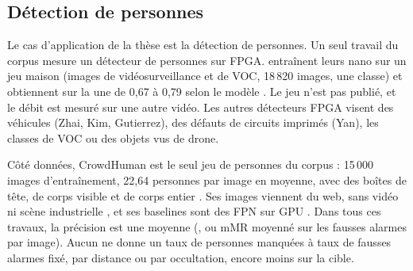 \subsection{Détection de personnes}

Le cas d'application de la thèse est la détection de personnes. Un seul travail du corpus
mesure un détecteur de personnes sur FPGA. \citet{arxiv-2607.13106-no-attention-no-problem-dpu}\pp{}
entraînent leurs  nano sur un jeu maison (images de vidéosurveillance et de VOC, 18\,820
images, une classe) et obtiennent sur la  une  de 0,67 à 0,79 selon le
modèle . Le jeu n'est pas publié, et le débit est mesuré sur une
autre vidéo. Les autres détecteurs FPGA visent des véhicules (Zhai, Kim, Gutierrez), des
défauts de circuits imprimés (Yan), les classes de VOC ou des objets vus de drone.

Côté données, CrowdHuman
\citep{arxiv-1805.00123-crowdhuman-benchmark-detecting-human-crowd}\pp{} est le seul jeu de
personnes du corpus : 15\,000 images d'entraînement, 22,64 personnes par image en moyenne,
avec des boîtes de tête, de corps visible et de corps entier . Ses images
viennent du web, sans vidéo ni scène industrielle , et ses baselines sont des
FPN  sur GPU . Dans tous ces travaux, la précision est une moyenne (,
ou mMR moyenné sur les fausses alarmes par image). Aucun ne donne un taux de personnes
manquées à taux de fausses alarmes fixé, par distance ou par occultation, encore moins sur
la cible.
